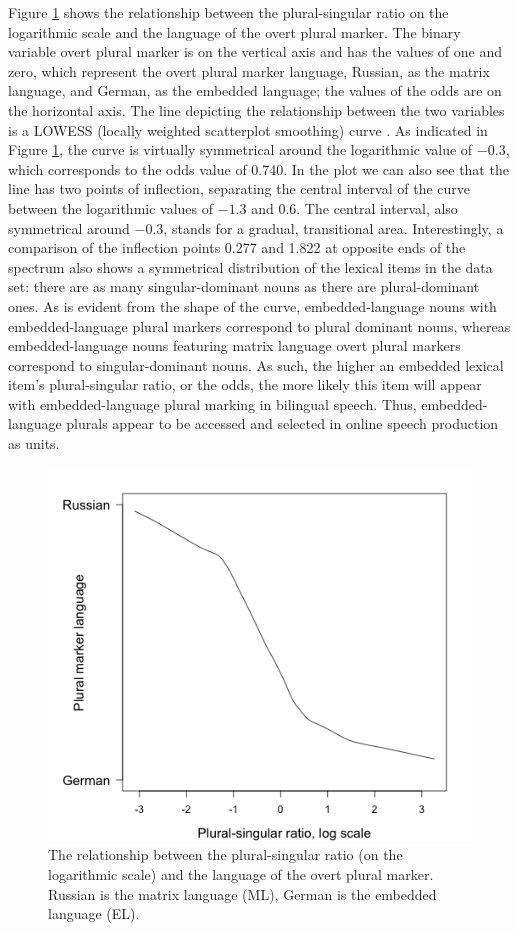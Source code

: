 Figure \ref{fig:6:2} shows the relationship between the plural-singular ratio on the logarithmic scale and the language of the overt plural marker. The binary variable overt plural marker is on the vertical axis and has the values of one and zero, which represent the overt plural marker language, Russian, as the matrix language, and German, as the embedded language; the values of the odds are on the horizontal axis. The line depicting the relationship between the two variables is a LOWESS (locally weighted scatterplot smoothing) curve \citep{lowess}. As indicated in Figure \ref{fig:6:2}, the curve is virtually symmetrical around the logarithmic value of $-0.3$, which corresponds to the odds value of 0.740. In the plot we can also see that the line has two points of inflection, separating the central interval of the curve between the logarithmic values of $-1.3$ and 0.6. The central interval, also symmetrical around $-0.3$, stands for a gradual, transitional area. Interestingly, a comparison of the inflection points 0.277 and 1.822 at opposite ends of the spectrum also shows a symmetrical distribution of the lexical items in the data set: there are as many singular-dominant nouns as there are plural-dominant ones. As is evident from the shape of the curve, embedded-language nouns with embedded-language plural markers correspond to plural dominant nouns, whereas embedded-language nouns  featuring matrix language overt plural markers correspond to singular-dominant nouns. As such, the higher an embedded lexical item’s plural-singular ratio, or the odds, the more likely this item will appear with embedded-language plural marking in bilingual speech. Thus, embedded-language plurals appear to be accessed and selected in online speech production as units.

\begin{figure}
\includegraphics[scale=0.5]{figures/6-Figure_2.png}
\caption{The relationship between the plural-singular ratio (on the logarithmic scale) and the language of the overt plural marker. Russian is the matrix language (ML), German is the embedded language (EL).\label{fig:6:2}}
\end{figure}

